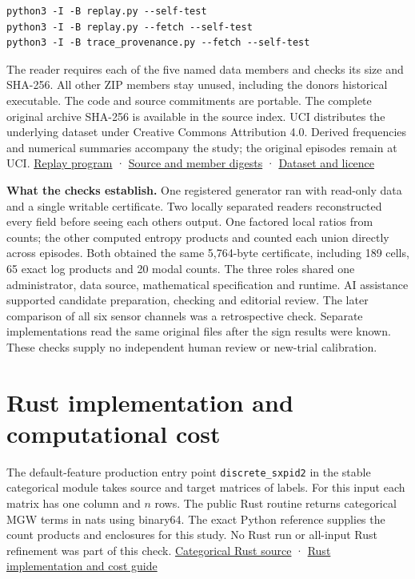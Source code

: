 \begin{verbatim}
python3 -I -B replay.py --self-test
python3 -I -B replay.py --fetch --self-test
python3 -I -B trace_provenance.py --fetch --self-test
\end{verbatim}

The reader requires each of the five named data members and checks its size and SHA-256. All other ZIP members stay unused, including the donor\textquotesingle s historical executable. The code and source commitments are portable. The complete original archive SHA-256 is available in the source index. UCI distributes the underlying dataset under Creative Commons Attribution 4.0. Derived frequencies and numerical summaries accompany the study; the original episodes remain at UCI. \href{https://github.com/sepahead/pid-rs/blob/main/audit/research/robot-wrist-slope-signs/replay.py}{Replay program} · \href{https://github.com/sepahead/pid-rs/blob/main/audit/research/robot-wrist-slope-signs/sources.json}{Source and member digests} · \href{https://doi.org/10.24432/C5M89N}{Dataset and licence}

\textbf{What the checks establish.} One registered generator ran with read-only data and a single writable certificate. Two locally separated readers reconstructed every field before seeing each other\textquotesingle s output. One factored local ratios from counts; the other computed entropy products and counted each union directly across episodes. Both obtained the same 5,764-byte certificate, including 189 cells, 65 exact log products and 20 modal counts. The three roles shared one administrator, data source, mathematical specification and runtime. AI assistance supported candidate preparation, checking and editorial review. The later comparison of all six sensor channels was a retrospective check. Separate implementations read the same original files after the sign results were known. These checks supply no independent human review or new-trial calibration.

\clearpage

\section{Rust implementation and computational cost}\label{rust-implementation-and-computational-cost}

The default-feature production entry point \texttt{discrete\_sxpid2} in the stable categorical module takes source and target matrices of labels. For this input each matrix has one column and \(n\) rows. The public Rust routine returns categorical MGW terms in nats using binary64. The exact Python reference supplies the count products and enclosures for this study. No Rust run or all-input Rust refinement was part of this check. \href{https://github.com/sepahead/pid-rs/blob/main/crates/pid-core/src/sxpid.rs}{Categorical Rust source} · \href{https://github.com/sepahead/pid-rs/blob/main/RUST_IMPLEMENTATION_AND_COST.md}{Rust implementation and cost guide}

